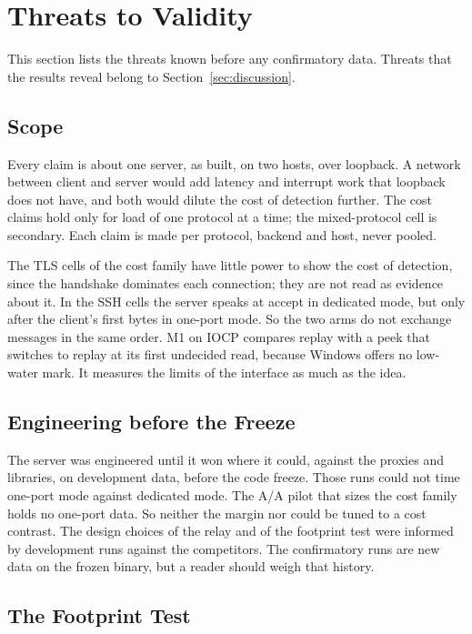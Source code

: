 \section{Threats to Validity}\label{sec:threats}

This section lists the threats known before any confirmatory data. Threats that the results reveal
belong to Section~\ref{sec:discussion}.

\subsection{Scope}\label{sec:threat-scope}

Every claim is about one server, as built, on two hosts, over loopback. A network between client
and server would add latency and interrupt work that loopback does not have, and both would dilute
the cost of detection further. The cost claims hold only for load of one protocol at a time; the
mixed-protocol cell is secondary. Each claim is made per protocol, backend and host, never pooled.

The TLS cells of the cost family have little power to show the cost of detection, since the
handshake dominates each connection; they are not read as evidence about it. In the SSH cells the
server speaks at accept in dedicated mode, but only after the client's first bytes in one-port
mode. So the two arms do not exchange messages in the same order. M1 on IOCP compares replay with
a peek that switches to replay at its first undecided read, because Windows offers no low-water
mark. It measures the limits of the interface as much as the idea.

\subsection{Engineering before the Freeze}\label{sec:threat-engineering}

The server was engineered until it won where it could, against the proxies and libraries, on
development data, before the code freeze. Those runs could not time one-port mode against
dedicated mode. The A/A pilot that sizes the cost family holds no one-port data. So neither the
margin nor \RC{} could be tuned to a cost contrast. The design choices of the relay and of the
footprint test were informed by development runs against the competitors. The confirmatory runs
are new data on the frozen binary, but a reader should weigh that history.

\subsection{The Footprint Test}\label{sec:threat-footprint}

